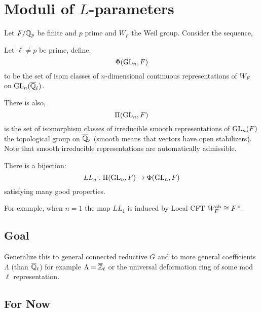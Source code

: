 \documentclass[12pt]{article}
\begin{document}
\newcommand{\Zspec}{\mathcal{Z}^{\mathrm{spec}}}


\section{Moduli of $L$-parameters}

Let $F / \mathbb{Q}_p$ be finite and $p$ prime and $W_F$ the Weil group. Consider the sequence,
\begin{center}
\end{center}

\begin{defn}
Let $\ell \neq p$ be prime, define,
\[ \Phi(\mathrm{GL}_n, F) \]
to be the set of isom classes of $n$-dimensional continuous representations of $W_F$ on $\mathrm{GL}_n(\overline{\mathbb{Q}}_\ell)$. 
\end{defn}

There is also,
\[ \Pi(\mathrm{GL}_n, F) \]
is the set of isomorphism classes of irreducible smooth representations of $\mathrm{GL}_n(F)$ the topological group on $\overline{\mathbb{Q}}_\ell$ (smooth means that vectors have open stabilizers). Note that smooth irreducible representations are automatically admissible.

\begin{theorem}
There is a bijection:
\[ LL_n : \Pi(\mathrm{GL}_n, F) \to \Phi(\mathrm{GL}_n, F) \]
satisfying many good properties.
\end{theorem}

\begin{rmk}
For example, when $n = 1$ the map $LL_1$ is induced by Local CFT $W_F^{\mathrm{ab}} \cong F^\times$.
\end{rmk}

\subsection{Goal}

Generalize this to general connected reductive $G$ and to more general coefficients $\Lambda$ (than $\overline{\mathbb{Q}}_\ell$) for example $\Lambda = \overline{\mathbb{Z}}_\ell$ or the universal deformation ring of some mod $\ell$ representation. 

\subsection{For Now}
\end{document}
